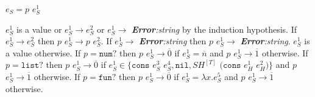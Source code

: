 \begin{case}
$e_{S}=p$ $e_{S}^{1}$

$e_{S}^{1}$ is a value or $e_{S}^{1}\rightarrow e_{S}^{2}$ or $e_{S}^{1}\rightarrow$ \emph{\textbf{Error}:\;string} by the induction hypothesis.  If $e_{S}^{1}\rightarrow e_{S}^{2}$ then $p$ $e_{S}^{1}\rightarrow p$ $e_{S}^{2}$.  If $e_{S}^{1}\rightarrow$ \emph{\textbf{Error}:\;string} then $p$ $e_{S}^{1}\rightarrow$ \emph{\textbf{Error}:\;string}.  $e_{S}^{1}$ is a value otherwise.  If $p=\mathtt{num?}$ then $p$ $e_{S}^{1}\rightarrow\overline{0}$ if $e_{S}^{1}=\overline{n}$ and $p$ $e_{S}^{1}\rightarrow\overline{1}$ otherwise.  If $p=\mathtt{list?}$ then $p$ $e_{S}^{1}\rightarrow\overline{0}$ if $e_{S}^{1}\in\lbrace\mathtt{cons}$ $e_{S}^{3}$ $e_{S}^{4},\mathtt{nil},SH^{[T]}$ $(\mathtt{cons}$ $e_{H}^{1}$ $e_{H}^{2})\rbrace$ and $p$ $e_{S}^{1}\rightarrow\overline{1}$ otherwise.  If $p=\mathtt{fun?}$ then $p$ $e_{S}^{1}\rightarrow\overline{0}$ if $e_{S}^{1}=\lambda x.e_{S}^{5}$ and $p$ $e_{S}^{1}\rightarrow\overline{1}$ otherwise.
\end{case}